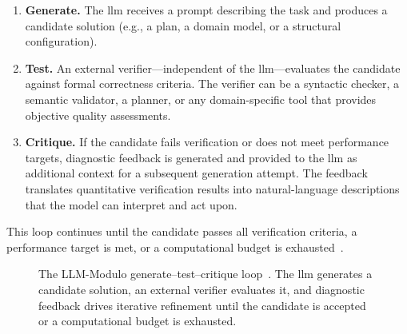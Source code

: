 \begin{enumerate}
  \item \textbf{Generate.} The \gls{llm} receives a prompt describing the task and produces a candidate solution (e.g., a plan, a domain model, or a structural configuration).

  \item \textbf{Test.} An external verifier---independent of the \gls{llm}---evaluates the candidate against formal correctness criteria. The verifier can be a syntactic checker, a semantic validator, a planner, or any domain-specific tool that provides objective quality assessments.

  \item \textbf{Critique.} If the candidate fails verification or does not meet performance targets, diagnostic feedback is generated and provided to the \gls{llm} as additional context for a subsequent generation attempt. The feedback translates quantitative verification results into natural-language descriptions that the model can interpret and act upon.
\end{enumerate}

\noindent This loop continues until the candidate passes all verification criteria, a performance target is met, or a computational budget is exhausted~\cite{Kambhampati2024}.

\begin{figure}[htbp]
  \centering
  \caption{The LLM-Modulo generate--test--critique loop~\cite{Kambhampati2024}. The \gls{llm} generates a candidate solution, an external verifier evaluates it, and diagnostic feedback drives iterative refinement until the candidate is accepted or a computational budget is exhausted.}
  \label{fig:llm_modulo}
\end{figure}

